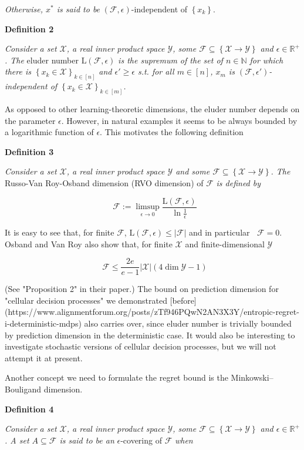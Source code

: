 \documentclass[a4paper]{article}
\newcommand{\Co}[1]{}
\newcommand{\AP}[1]{\left(#1\right)}
\newcommand{\AC}[1]{\left\{#1\right\}}
\newcommand{\Nats}{\mathbb{N}}
\newcommand{\Reals}{\mathbb{R}}
\newcommand{\Abs}[1]{\left\vert #1 \right\vert}
\newcommand{\X}{\mathcal{X}}
\newcommand{\Y}{\mathcal{Y}}
\newcommand{\F}{\mathcal{F}}
\newcommand{\El}{\mathrm{L}}
\DeclareMathOperator{\RVO}{\dim_{RVO}}
\begin{document}
\textit{Otherwise, $x^*$ is said to be}\Co{i} $\AP{\F,\epsilon}$-independent of $\AC{x_k}$.

\textbf{Definition 2}\Co{b}

\textit{Consider a set $\X$, a real inner product space $\Y$, some $\F\subseteq\AC{\X\rightarrow\Y}$ and $\epsilon\in\Reals^+$. The}\Co{i} eluder number $\El(\F,\epsilon)$ \textit{is the supremum of the set of $n\in\Nats$ for which there is $\AC{x_k\in\X}_{k\in[n]}$ and $\epsilon'\geq\epsilon$ s.t. for all $m\in[n]$, $x_m$ is $\AP{\F,\epsilon'}$-independent of $\AC{x_k\in\X}_{k\in[m]}$.}\Co{i}


As opposed to other learning-theoretic dimensions, the eluder number depends on the parameter $\epsilon$. However, in natural examples it seems to be always bounded by a logarithmic function of $\epsilon$. This motivates the following definition

\textbf{Definition 3}\Co{b}

\textit{Consider a set $\X$, a real inner product space $\Y$ and some $\F\subseteq\AC{\X\rightarrow\Y}$. The}\Co{i} Russo-Van Roy-Osband dimension (RVO dimension) of $\F$ \textit{is defined by}\Co{i}

$$\RVO{\F}:=\limsup_{\epsilon \rightarrow 0}{\frac{\El(\F,\epsilon)}{\ln\frac{1}{\epsilon}}}$$

It is easy to see that, for finite $\F$, $\El(\F,\epsilon)\leq\Abs{\F}$ and in particular $\RVO\F=0$. Osband and Van Roy also show that, for finite $\X$ and finite-dimensional $\Y$

$$\RVO\F\leq \frac{2e}{e-1}\Abs{\X}\AP{4\dim{\Y}-1}$$

(See "Proposition 2" in their paper.) The bound on prediction dimension for "cellular decision processes" we demonstrated [before](https://www.alignmentforum.org/posts/zTf946PQwN2AN3X3Y/entropic-regret-i-deterministic-mdps) also carries over, since eluder number is trivially bounded by prediction dimension in the deterministic case. It would also be interesting to investigate stochastic versions of cellular decision processes, but we will not attempt it at present.

Another concept we need to formulate the regret bound is the Minkowski–Bouligand dimension.

\textbf{Definition 4}\Co{b}

\textit{Consider a set $\X$, a real inner product space $\Y$, some $\F\subseteq\AC{\X\rightarrow\Y}$ and $\epsilon\in\Reals^+$. A set $A\subseteq\F$ is said to be an}\Co{i} $\epsilon$-covering of $\F$ \textit{when}\Co{i}
\end{document}
